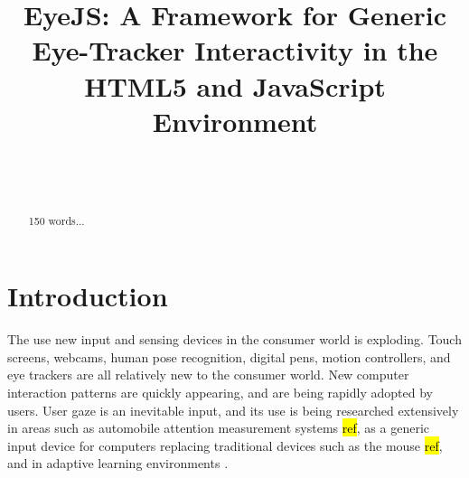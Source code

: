 \documentclass{sigchi}
\begin{document}
\title{EyeJS: A Framework for Generic Eye-Tracker Interactivity in the HTML5 and JavaScript Environment}

\author{%
  \\
  \\
}

\maketitle



\begin{abstract}
  150 words...
\end{abstract}









\section{Introduction}
The use new input and sensing devices in the consumer world is exploding. Touch screens, webcams, human pose recognition, digital pens, motion controllers, and eye trackers are all relatively new to the consumer world. New computer interaction patterns are quickly appearing, and are being rapidly adopted by users. User gaze is an inevitable input, and its use is being researched extensively in areas such as automobile attention measurement systems \hl{ref}, as a generic input device for computers replacing traditional devices such as the mouse \hl{ref}, and in adaptive learning environments \cite{wassermann2012generic}.
\end{document}
